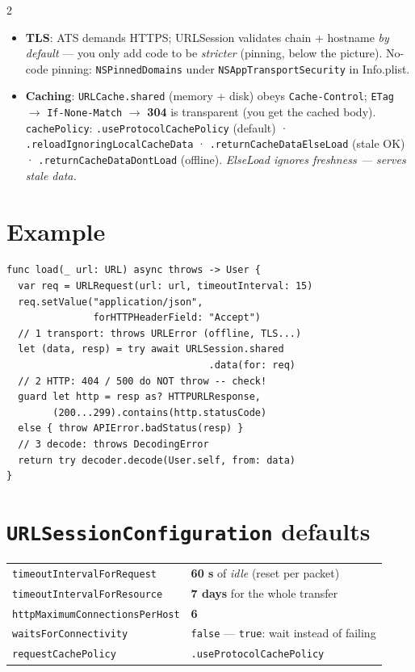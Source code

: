 \documentclass[8pt]{extarticle}
\begin{document}
\begin{multicols}{2}
\begin{itemize}
        Dates: default \texttt{.deferredToDate} (seconds since 2001!) — set \texttt{.iso8601}.
  \item \textbf{TLS}: ATS demands HTTPS; URLSession validates chain + hostname \emph{by default}
        — you only add code to be \emph{stricter} (pinning, below the picture). No-code
        pinning: \texttt{NSPinnedDomains} under \texttt{NSAppTransportSecurity} in Info.plist.
  \item \textbf{Caching}: \texttt{URLCache.shared} (memory + disk) obeys \texttt{Cache-Control};
        \texttt{ETag} $\to$ \texttt{If-None-Match} $\to$ \textbf{304} is transparent (you get the
        cached body). \texttt{cachePolicy}: \texttt{.useProtocolCachePolicy} (default) ·
        \texttt{.reloadIgnoringLocalCacheData} · \texttt{.returnCacheDataElseLoad} (stale OK) ·
        \texttt{.returnCacheDataDontLoad} (offline). \emph{ElseLoad ignores freshness — serves stale data.}
\end{itemize}

\section{Example}
\begin{lstlisting}[language=SwiftSheet]
func load(_ url: URL) async throws -> User {
  var req = URLRequest(url: url, timeoutInterval: 15)
  req.setValue("application/json",
               forHTTPHeaderField: "Accept")
  // 1 transport: throws URLError (offline, TLS...)
  let (data, resp) = try await URLSession.shared
                                   .data(for: req)
  // 2 HTTP: 404 / 500 do NOT throw -- check!
  guard let http = resp as? HTTPURLResponse,
        (200...299).contains(http.statusCode)
  else { throw APIError.badStatus(resp) }
  // 3 decode: throws DecodingError
  return try decoder.decode(User.self, from: data)
}
\end{lstlisting}

\section{\texttt{URLSessionConfiguration} defaults}
{\footnotesize
\begin{tabular}{@{}l l@{}}
\toprule
\texttt{timeoutIntervalForRequest} & \textbf{60 s} of \emph{idle} (reset per packet) \\
\texttt{timeoutIntervalForResource} & \textbf{7 days} for the whole transfer \\
\texttt{httpMaximumConnectionsPerHost} & \textbf{6} \\
\texttt{waitsForConnectivity} & \texttt{false} — \texttt{true}: wait instead of failing \\
\texttt{requestCachePolicy} & \texttt{.useProtocolCachePolicy} \\
\bottomrule
\end{tabular}}


\end{multicols}
\end{document}
